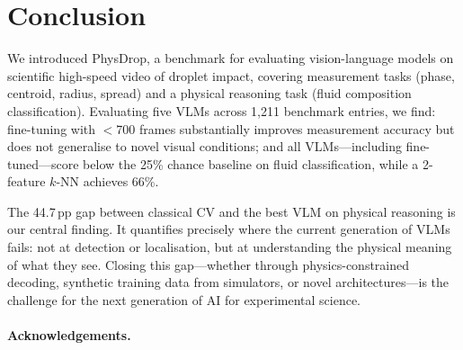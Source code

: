 \documentclass[10pt,twocolumn,letterpaper]{article}
\begin{document}
\section{Conclusion}
\label{sec:conclusion}

We introduced PhysDrop, a benchmark for evaluating vision-language models on
scientific high-speed video of droplet impact, covering measurement tasks
(phase, centroid, radius, spread) and a physical reasoning task (fluid
composition classification).
Evaluating five VLMs across 1{,}211 benchmark entries, we find:
fine-tuning with $<$700 frames substantially improves measurement accuracy
but does not generalise to novel visual conditions;
and all VLMs—including fine-tuned—score below the 25\% chance baseline on
fluid classification, while a 2-feature $k$-NN achieves 66\%.

The 44.7\,pp gap between classical CV and the best VLM on physical reasoning
is our central finding.
It quantifies precisely where the current generation of VLMs fails: not at
detection or localisation, but at understanding the physical meaning of what
they see.
Closing this gap—whether through physics-constrained decoding, synthetic
training data from simulators, or novel architectures—is the challenge for
the next generation of AI for experimental science.

\paragraph{Acknowledgements.}

{\small


}
\end{document}
